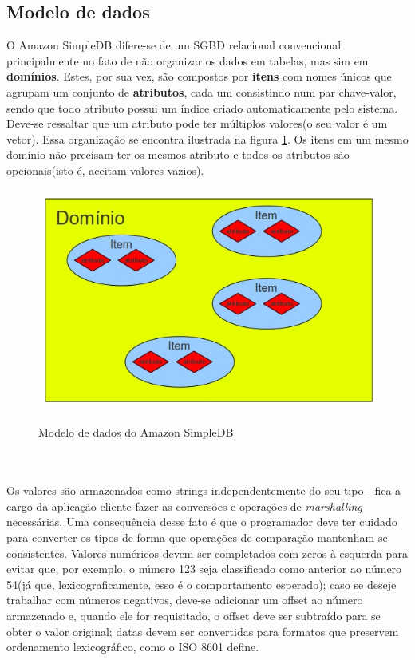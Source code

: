 \subsection{Modelo de dados}
	O Amazon SimpleDB difere-se de um SGBD relacional convencional principalmente no fato de não organizar os dados em tabelas, mas sim em \textbf{domínios}. Estes, por sua vez, são compostos por \textbf{itens} com nomes únicos que agrupam um conjunto de \textbf{atributos}, cada um consistindo num par chave-valor, sendo que todo atributo possui um índice criado automaticamente pelo sistema. Deve-se ressaltar que um atributo pode ter múltiplos valores(o seu valor é um vetor). Essa organização se encontra ilustrada na figura \ref{fig:hierarquiaDados}. Os itens em um mesmo domínio não precisam ter os mesmos atributo e todos os atributos são opcionais(isto é, aceitam valores vazios).
\begin{figure}
	\centering
	\includegraphics[scale=0.5]{figuras/simpledb_hierarquia_dados.jpg}
	\label{fig:hierarquiaDados}
	\caption{Modelo de dados do Amazon SimpleDB}
\end{figure}
\\\\ Os valores são armazenados como strings independentemente do seu tipo - fica a cargo da aplicação cliente fazer as conversões e operações de \textit{marshalling} necessárias. Uma consequência desse fato é que o programador deve ter cuidado para converter os tipos de forma que operações de comparação mantenham-se consistentes. Valores numéricos devem ser completados com zeros à esquerda para evitar que, por exemplo, o número 123 seja classificado como anterior ao número 54(já que, lexicograficamente, esso é o comportamento esperado); caso se deseje trabalhar com números negativos, deve-se adicionar um offset ao número armazenado e, quando ele for requisitado, o offset deve ser subtraído para se obter o valor original; datas devem ser convertidas para formatos que preservem ordenamento lexicográfico, como o ISO 8601 define.
